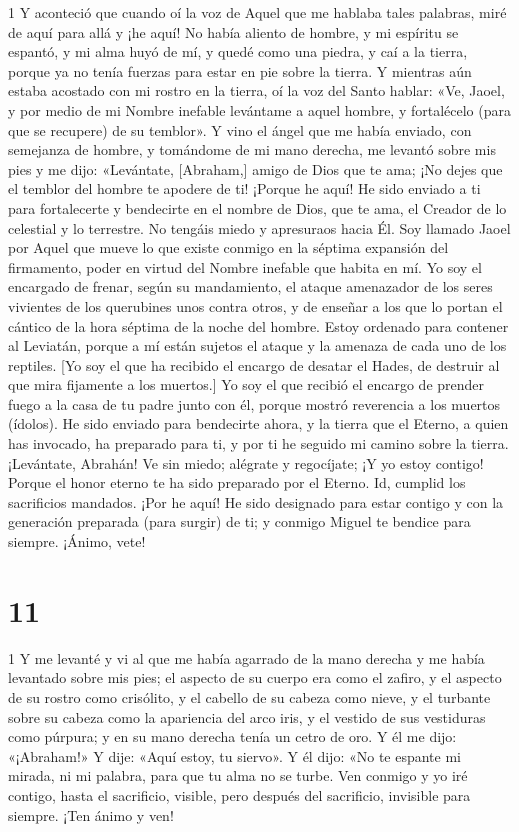 \par 1 Y aconteció que cuando oí la voz de Aquel que me hablaba tales palabras, miré de aquí para allá y ¡he aquí! No había aliento de hombre, y mi espíritu se espantó, y mi alma huyó de mí, y quedé como una piedra, y caí a la tierra, porque ya no tenía fuerzas para estar en pie sobre la tierra. Y mientras aún estaba acostado con mi rostro en la tierra, oí la voz del Santo hablar: «Ve, Jaoel, y por medio de mi Nombre inefable levántame a aquel hombre, y fortalécelo (para que se recupere) de su temblor». Y vino el ángel que me había enviado, con semejanza de hombre, y tomándome de mi mano derecha, me levantó sobre mis pies y me dijo: «Levántate, [Abraham,] amigo de Dios que te ama; ¡No dejes que el temblor del hombre te apodere de ti! ¡Porque he aquí! He sido enviado a ti para fortalecerte y bendecirte en el nombre de Dios, que te ama, el Creador de lo celestial y lo terrestre. No tengáis miedo y apresuraos hacia Él. Soy llamado Jaoel por Aquel que mueve lo que existe conmigo en la séptima expansión del firmamento, poder en virtud del Nombre inefable que habita en mí. Yo soy el encargado de frenar, según su mandamiento, el ataque amenazador de los seres vivientes de los querubines unos contra otros, y de enseñar a los que lo portan el cántico de la hora séptima de la noche del hombre. Estoy ordenado para contener al Leviatán, porque a mí están sujetos el ataque y la amenaza de cada uno de los reptiles. [Yo soy el que ha recibido el encargo de desatar el Hades, de destruir al que mira fijamente a los muertos.] Yo soy el que recibió el encargo de prender fuego a la casa de tu padre junto con él, porque mostró reverencia a los muertos (ídolos). He sido enviado para bendecirte ahora, y la tierra que el Eterno, a quien has invocado, ha preparado para ti, y por ti he seguido mi camino sobre la tierra. ¡Levántate, Abrahán! Ve sin miedo; alégrate y regocíjate; ¡Y yo estoy contigo! Porque el honor eterno te ha sido preparado por el Eterno. Id, cumplid los sacrificios mandados. ¡Por he aquí! He sido designado para estar contigo y con la generación preparada (para surgir) de ti; y conmigo Miguel te bendice para siempre. ¡Ánimo, vete!

\chapter{11}

\par 1 Y me levanté y vi al que me había agarrado de la mano derecha y me había levantado sobre mis pies; el aspecto de su cuerpo era como el zafiro, y el aspecto de su rostro como crisólito, y el cabello de su cabeza como nieve, y el turbante sobre su cabeza como la apariencia del arco iris, y el vestido de sus vestiduras como púrpura; y en su mano derecha tenía un cetro de oro. Y él me dijo: «¡Abraham!» Y dije: «Aquí estoy, tu siervo». Y él dijo: «No te espante mi mirada, ni mi palabra, para que tu alma no se turbe. Ven conmigo y yo iré contigo, hasta el sacrificio, visible, pero después del sacrificio, invisible para siempre. ¡Ten ánimo y ven!

